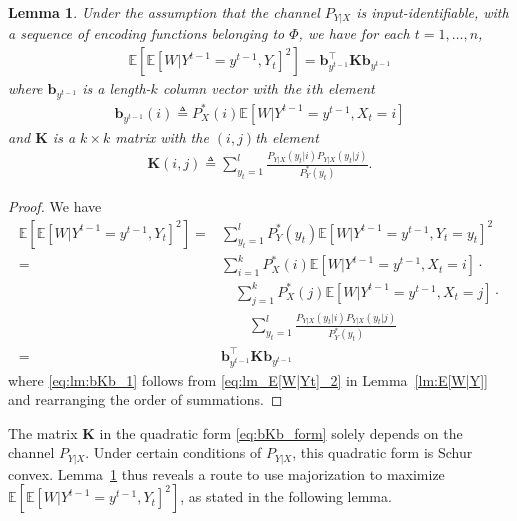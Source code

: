 \documentclass{article}
\newtheorem{lemma}{Lemma}
\newcommand{\E}{\mathbb{E}}
\def\deq{\triangleq}
\begin{document}
\begin{lemma}\label{lm:E[W|Y]^2}
Under the assumption that the channel $P_{Y|X}$ is input-identifiable, with a sequence of encoding functions belonging to $\mathsf\Phi$, we have for each $t=1,\ldots,n$,
\begin{align}
 \E[\E[W|Y^{t-1}=y^{t-1}, Y_t]^2] = {\boldsymbol b}_{y^{t-1}}^\top {\boldsymbol K} {\boldsymbol b}_{y^{t-1}} \label{eq:bKb_form}
\end{align}
where ${\boldsymbol b}_{y^{t-1}}$ is a length-$k$ column vector with the $i$th element
\begin{align}
{\boldsymbol b}_{y^{t-1}}(i) \deq P_{X}^*(i) \E[W|Y^{t-1}=y^{t-1}, X_t=i] \label{eq:b_def}
\end{align}
and ${\boldsymbol K}$ is a $k\times k$ matrix with the $(i,j)$th element
\begin{align}
{\boldsymbol K}(i,j) \deq \sum_{y_t=1}^l \frac{P_{Y|X}(y_t|i) P_{Y|X}(y_t|j)}{P_{Y}^*(y_t)}  . \label{eq:K_def}
\end{align}
\end{lemma}
\begin{proof}
We have
\begin{align}
\E[\E[W|Y^{t-1}=y^{t-1}, Y_t]^2] 
=& \sum_{y_t=1}^l P_{Y}^*(y_t) \E[W|Y^{t-1}=y^{t-1}, Y_t = y_t]^2 \\
=  
& \sum_{i=1}^k P_{X}^*(i) \E[W|Y^{t-1}=y^{t-1}, X_t=i] \cdot \nonumber \\
& \quad \sum_{j=1}^k P_{X}^*(j) \E[W|Y^{t-1}=y^{t-1}, X_t=j]  \cdot \nonumber \\
& \qquad \sum_{y_t=1}^l \frac{ P_{Y|X}(y_t|i) P_{Y|X}(y_t|j)}{P_{Y}^*(y_t)} \label{eq:lm:bKb_1} \\
= &
{\boldsymbol b}_{y^{t-1}}^\top {\boldsymbol K} {\boldsymbol b}_{y^{t-1}} 
\end{align}
where \eqref{eq:lm:bKb_1} follows from \eqref{eq:lm_E[W|Yt]_2} in Lemma~\ref{lm:E[W|Y]} and rearranging the order of summations.
\end{proof}
The matrix $\boldsymbol{K}$ in the quadratic form \eqref{eq:bKb_form} solely depends on the channel $P_{Y|X}$. Under certain conditions of $P_{Y|X}$, this quadratic form is Schur convex. Lemma~\ref{lm:E[W|Y]^2} thus reveals a route to use majorization to maximize $\E[\E[W|Y^{t-1}=y^{t-1}, Y_t]^2]$, as stated in the following lemma.
\end{document}
